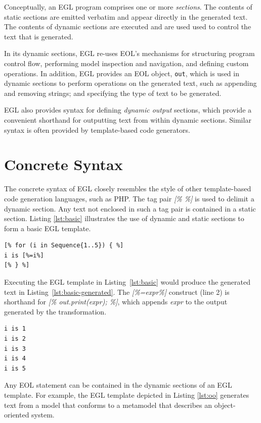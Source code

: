 Conceptually, an EGL program comprises one or more \emph{sections}. The contents of static
sections are emitted verbatim and appear directly in the
generated text. The contents of dynamic sections are executed and are used
used to control the text that is generated.

In its dynamic sections, EGL re-uses EOL's mechanisms for structuring
program control flow, performing model inspection and navigation, and
defining custom operations. In addition, EGL provides an EOL object, \verb|out|,
which is used in dynamic sections to perform operations on the generated text, 
such as appending and removing strings; and specifying the type of text to be generated.

EGL also provides syntax for defining \textit{dynamic output}
sections, which provide a convenient shorthand for outputting text
from within dynamic sections. Similar syntax is often provided by
template-based code generators.

\section{Concrete Syntax}
\label{concretesyntax}

The concrete syntax of EGL closely resembles the style of other
template-based code generation languages, such as PHP. The tag pair \emph{[\% \%]} is
used to delimit a dynamic section. Any text not enclosed in such a tag
pair is contained in a static section. Listing
\ref{lst:basic} illustrates the use of dynamic and static sections to
form a basic EGL template.

\begin{lstlisting}[float=tbp, caption=A basic EGL template., label=lst:basic, language=EGL]
[% for (i in Sequence{1..5}) { %]
i is [%=i%]
[% } %]
\end{lstlisting}

Executing the EGL template in Listing~\ref{lst:basic} would produce the generated
text in Listing~\ref{lst:basic-generated}. The \emph{[\%=expr\%]} construct (line 2) is shorthand for \emph{[\%
  out.print(expr); \%]}, which appends \emph{expr} to the output
generated by the transformation.

\begin{lstlisting}[float=tbp, caption=The text generated from the basic EGL template (Listing~\ref{lst:basic})., label=lst:basic-generated]
i is 1
i is 2
i is 3
i is 4
i is 5
\end{lstlisting}

Any EOL statement can be contained in the dynamic sections of an EGL template.
For example, the EGL template depicted in Listing \ref{lst:oo} generates text
from a model that conforms to a metamodel that describes an
object-oriented system. %

